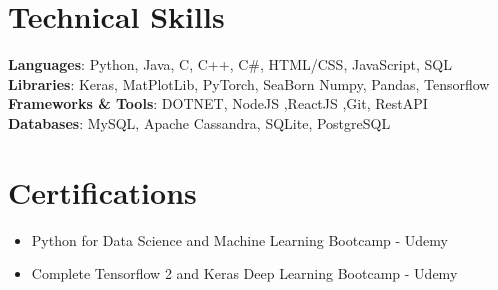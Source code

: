 \documentclass[letterpaper,11pt]{article}
\newcommand{\resumeItem}[1]{
  \item\small{
    {#1 \vspace{-2pt}}
  }
}
\newcommand{\resumeItemListStart}{\begin{itemize}}
\newcommand{\resumeItemListEnd}{\end{itemize}\vspace{-5pt}}
\begin{document}
\section{Technical Skills}
 \begin{itemize}[leftmargin=0.15in, label={}]
    \small{\item{
    \textbf{Languages}{: Python, Java, C, C++, C\#,  HTML/CSS, JavaScript, SQL} \\
     \textbf{Libraries}{: Keras, MatPlotLib, PyTorch, SeaBorn Numpy, Pandas, Tensorflow } \\
     \textbf{Frameworks \& Tools}{: DOTNET, NodeJS ,ReactJS ,Git, RestAPI } \\
     \textbf{Databases}{: MySQL, Apache Cassandra, SQLite, PostgreSQL} \\
    }}
 \end{itemize}
 \vspace{-16pt}

\section{Certifications}
            \resumeItemListStart
                \resumeItem{Python for Data Science and Machine Learning Bootcamp - Udemy}
                \resumeItem{Complete Tensorflow 2 and Keras Deep Learning Bootcamp - Udemy}
            \resumeItemListEnd
\end{document}
